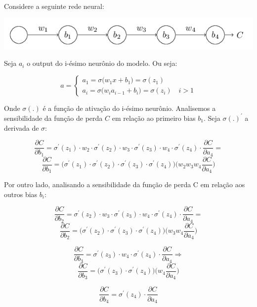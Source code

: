 \documentclass[
	12pt,				%
	oneside,			%
	a4paper,			%
	english,			%
	french,				%
	spanish,			%
	brazil,				%
	]{abntex2}
\begin{document}
Considere a seguinte rede neural:

\begin{center}
	\includegraphics[scale=0.8]{nnetsimples.png}
\end{center} 

Seja $a_i$ o output do i-\'esimo neur\^onio do modelo. Ou seja:


$$a = \begin{cases}
a_1 = \sigma\big( w_1 x + b_1\big) = \sigma( z_1 ) \\
a_i = \sigma\big( w_i a_{i-1} + b_i\big) = \sigma( z_i ) \enspace \enspace i>1
\end{cases}$$

Onde $\sigma(.)$ \'e a fun\c{c}\~ao de ativa\c{c}\~ao do i-\'esimo neur\^onio. Analisemos a sensibilidade da fun\c{c}\~ao de perda $C$ em rela\c{c}\~ao ao primeiro bias $b_1$. Seja $\sigma(.)^{'}$ a derivada de $\sigma$:

$$ \frac{\partial C}{\partial b_1} = \sigma^{'}(z_1) \cdot w_2 \cdot \sigma^{'}(z_2) \cdot w_3 \cdot \sigma^{'}(z_3) \cdot w_4 \cdot  \sigma^{'}(z_4)\cdot\frac{\partial C}{\partial a_4} = $$
$$\frac{\partial C}{\partial b_1} =\bigg( \sigma^{'}(z_1) \cdot \sigma^{'}(z_2) \cdot \sigma^{'}(z_3) \cdot \sigma^{'}(z_4) \bigg)\bigg( w_2 w_3 w_4 \frac{\partial C}{\partial a_4}\bigg) $$

Por outro lado, analisando a sensibilidade da fun\c{c}\~ao de perda C em rela\c{c}\~ao aos outros bias $b_i$:

$$ \frac{\partial C}{\partial b_2} = \sigma^{'}(z_2) \cdot w_3 \cdot \sigma^{'}(z_3) \cdot w_4 \cdot  \sigma^{'}(z_4)\cdot\frac{\partial C}{\partial a_4} = $$
$$ \frac{\partial C}{\partial b_2} = \bigg( \sigma^{'}(z_2) \cdot \sigma^{'}(z_3) \cdot \sigma^{'}(z_4) \bigg)\bigg( w_3 w_4 \frac{\partial C}{\partial a_4}\bigg) $$

$$ \frac{\partial C}{\partial b_3} = \sigma^{'}(z_3) \cdot w_4 \cdot  \sigma^{'}(z_4)\cdot\frac{\partial C}{\partial a_4} \Rightarrow $$
$$\frac{\partial C}{\partial b_3} = \bigg( \sigma^{'}(z_3) \cdot \sigma^{'}(z_4) \bigg)\bigg( w_4 \frac{\partial C}{\partial a_4}\bigg) $$

$$ \frac{\partial C}{\partial b_4} =  \sigma^{'}(z_4)\cdot\frac{\partial C}{\partial a_4} $$
\end{document}
